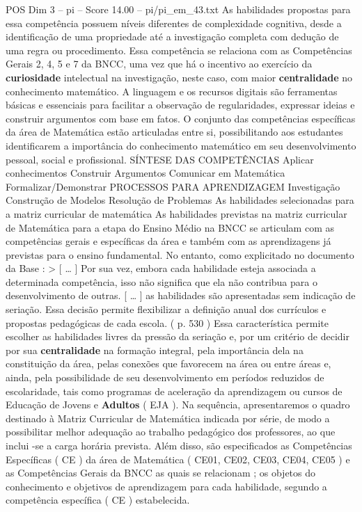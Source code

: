 \begin{textsample}{POS Dim 3 – pi – Score 14.00 – pi/pi\_em\_43.txt}
As habilidades propostas para essa competência possuem níveis diferentes de complexidade cognitiva, desde a identificação de uma propriedade até a investigação completa com dedução de uma regra ou procedimento.
Essa competência se relaciona com as Competências Gerais 2, 4, 5 e 7 da BNCC, uma vez que há o incentivo ao exercício da \textbf{curiosidade} intelectual na investigação, neste caso, com maior \textbf{centralidade} no conhecimento matemático.
A linguagem e os recursos digitais são ferramentas básicas e essenciais para facilitar a observação de regularidades, expressar ideias e construir argumentos com base em fatos.
O conjunto das competências específicas da área de Matemática estão articuladas entre si, possibilitando aos estudantes identificarem a importância do conhecimento matemático em seu desenvolvimento pessoal, social e profissional.
SÍNTESE DAS COMPETÊNCIAS Aplicar conhecimentos Construir Argumentos Comunicar em Matemática Formalizar/Demonstrar PROCESSOS PARA APRENDIZAGEM Investigação Construção de Modelos Resolução de Problemas As habilidades selecionadas para a matriz curricular de matemática As habilidades previstas na matriz curricular de Matemática para a etapa do Ensino Médio na BNCC se articulam com as competências gerais e específicas da área e também com as aprendizagens já previstas para o ensino fundamental.
No entanto, como explicitado no documento da Base : > [ … ] Por sua vez, embora cada habilidade esteja associada a determinada competência, isso não significa que ela não contribua para o desenvolvimento de outras. [ … ] as habilidades são apresentadas sem indicação de seriação.
Essa decisão permite flexibilizar a definição anual dos currículos e propostas pedagógicas de cada escola. ( p. 530 ) Essa característica permite escolher as habilidades livres da pressão da seriação e, por um critério de decidir por sua \textbf{centralidade} na formação integral, pela importância dela na constituição da área, pelas conexões que favorecem na área ou entre áreas e, ainda, pela possibilidade de seu desenvolvimento em períodos reduzidos de escolaridade, tais como programas de aceleração da aprendizagem ou cursos de Educação de Jovens e \textbf{Adultos} ( EJA ).
Na sequência, apresentaremos o quadro destinado à Matriz Curricular de Matemática indicada por série, de modo a possibilitar melhor adequação ao trabalho pedagógico dos professores, ao que inclui -se a carga horária prevista.
Além disso, são especificados as Competências Específicas ( CE ) da área de Matemática ( CE01, CE02, CE03, CE04, CE05 ) e as Competências Gerais da BNCC as quais se relacionam ; os objetos do conhecimento e objetivos de aprendizagem para cada habilidade, segundo a competência específica ( CE ) estabelecida.

\end{textsample}
